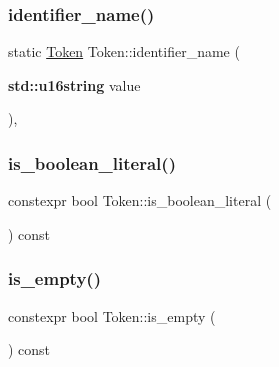 \subsubsection{\texorpdfstring{identifier\+\_\+name()}{identifier\_name()}}
{\footnotesize\ttfamily static \hyperlink{class_token}{Token} Token\+::identifier\+\_\+name (\begin{DoxyParamCaption}\item[{\textbf{ std\+::u16string}}]{value }\end{DoxyParamCaption})\hspace{0.3cm}{\ttfamily [inline]}, {\ttfamily [static]}}

\mbox{\label{class_token_a296a03d064fa381593ac2af270739859}} 
\subsubsection{\texorpdfstring{is\+\_\+boolean\+\_\+literal()}{is\_boolean\_literal()}}
{\footnotesize\ttfamily constexpr bool Token\+::is\+\_\+boolean\+\_\+literal (\begin{DoxyParamCaption}{ }\end{DoxyParamCaption}) const\hspace{0.3cm}{\ttfamily [inline]}}

\mbox{\label{class_token_a9c8d38440d6d13ad1c8c943045e0a508}} 
\subsubsection{\texorpdfstring{is\+\_\+empty()}{is\_empty()}}
{\footnotesize\ttfamily constexpr bool Token\+::is\+\_\+empty (\begin{DoxyParamCaption}{ }\end{DoxyParamCaption}) const\hspace{0.3cm}{\ttfamily [inline]}}

\mbox{\label{class_token_a67a50656bf4d9044c6c792b4eadc5e54}} 
